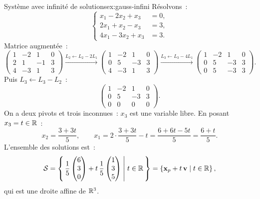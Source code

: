 \begin{example}{Système avec infinité de solutions}{ex:gauss-infini}
  Résolvons~:
  \[
    \left\{
    \begin{aligned}
      x_1 - 2x_2 + x_3 &= 0,\\
      2x_1 + x_2 - x_3 &= 3,\\
      4x_1 - 3x_2 + x_3 &= 3.
    \end{aligned}
    \right.
  \]
  Matrice augmentée~:
  \[
    \left(\begin{array}{ccc|c}
      1 & -2 & 1 & 0\\
      2 & 1 & -1 & 3\\
      4 & -3 & 1 & 3
    \end{array}\right)
    \xrightarrow{L_2\leftarrow L_2-2L_1}
    \left(\begin{array}{ccc|c}
      1 & -2 & 1 & 0\\
      0 & 5 & -3 & 3\\
      4 & -3 & 1 & 3
    \end{array}\right)
    \xrightarrow{L_3\leftarrow L_3-4L_1}
    \left(\begin{array}{ccc|c}
      1 & -2 & 1 & 0\\
      0 & 5 & -3 & 3\\
      0 & 5 & -3 & 3
    \end{array}\right).
  \]
  Puis $L_3\leftarrow L_3-L_2$~:
  \[
    \left(\begin{array}{ccc|c}
      1 & -2 & 1 & 0\\
      0 & 5 & -3 & 3\\
      0 & 0 & 0 & 0
    \end{array}\right).
  \]
  On a deux pivots et trois inconnues~: $x_3$ est une variable libre.
  En posant $x_3=t\in{\mathbb{R}}$~:
  \[
    x_2=\frac{3+3t}{5},\qquad
    x_1=2\cdot\frac{3+3t}{5}-t=\frac{6+6t-5t}{5}=\frac{6+t}{5}.
  \]
  L'ensemble des solutions est~:
  \[
    {\mathcal{S}}=\left\{\,\frac{1}{5}\begin{pmatrix}6\\3\\0\end{pmatrix}
      +t\,\frac{1}{5}\begin{pmatrix}1\\3\\5\end{pmatrix}\;\middle|\;t\in{\mathbb{R}}\,\right\}
    =\left\{\mathbf{x}_p+t\,\mathbf{v}\mid t\in{\mathbb{R}}\right\},
  \]
  qui est une droite affine de ${\mathbb{R}}^3$.
\end{example}

